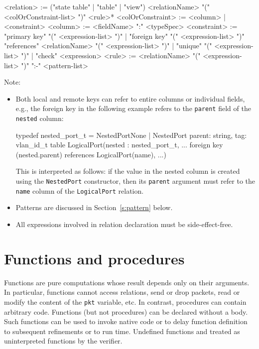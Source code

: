 \documentclass{report}
\newcommand{\src}[1]{\texttt{#1}}
\begin{document}
\begin{bnflisting}{}
<relation> := ("state table" | "table" | "view") <relationName> 
             "(" <colOrConstraint-list> ")"
             <rule>* 
<colOrConstraint> := <column> | <constraint>
<column> := <fieldName> ":" <typeSpec>
<constraint> := "primary key" "(" <expression-list> ")"
              | "foreign key"  "(" <expression-list> ")" 
                         "references" <relationName> "(" <expression-list> ")"
              | "unique" "(" <expression-list> ")"
              | "check" <expression>
<rule> := <relationName> "(" <expression-list> ")" 
          ":-" <pattern-list> 
\end{bnflisting}

Note:
\begin{itemize}
    \item Both local and remote keys can refer to entire columns or 
          individual fields, e.g., the foreign key in the following 
          example refers to the \src{parent} field of the 
          \src{nested} column:
\begin{ccnlisting}{}
typedef nested_port_t = NestedPortNone
                      | NestedPort {parent: string, tag: vlan_id_t}
table LogicalPort(nested    : nested_port_t,
                  ...
                  foreign key (nested.parent) references LogicalPort(name),
                  ...)
\end{ccnlisting}
          This is interpreted as follows: if the value in the nested
          column is created using the \src{NestedPort} constructor,
          then its \src{parent} argument must refer to the \src{name}
          column of the \src{LogicalPort} relation.
    \item Patterns are discussed in Section~\ref{s:pattern} below.
    \item All expressions involved in relation declaration must be side-effect-free.
\end{itemize}



\section{Functions and procedures}

Functions are pure computations whose result depends only on their arguments.  
In particular, functions cannot access relations, send or drop packets, read 
or modify the content of the \src{pkt} variable, etc.  In contrast, 
procedures can contain arbitrary code.  Functions (but not procedures) can
be declared without a body.  Such functions can be used to invoke native code 
or to delay function definition to subsequent refinements or to run time.  
Undefined functions and treated as uninterpreted functions by the verifier.
\end{document}
